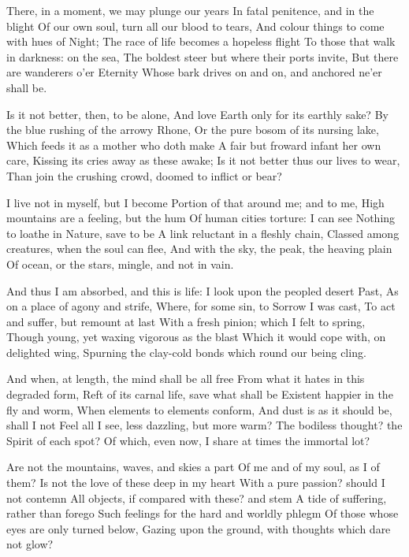 \documentclass[10pt,twocolumn]{book}
\begin{document}
   There, in a moment, we may plunge our years
   In fatal penitence, and in the blight
   Of our own soul, turn all our blood to tears,
   And colour things to come with hues of Night;
   The race of life becomes a hopeless flight
   To those that walk in darkness:  on the sea,
   The boldest steer but where their ports invite,
   But there are wanderers o'er Eternity
Whose bark drives on and on, and anchored ne'er shall be.


   Is it not better, then, to be alone,
   And love Earth only for its earthly sake?
   By the blue rushing of the arrowy Rhone,
   Or the pure bosom of its nursing lake,
   Which feeds it as a mother who doth make
   A fair but froward infant her own care,
   Kissing its cries away as these awake;\textemdash
   Is it not better thus our lives to wear,
Than join the crushing crowd, doomed to inflict or bear?


   I live not in myself, but I become
   Portion of that around me; and to me,
   High mountains are a feeling, but the hum
   Of human cities torture:  I can see
   Nothing to loathe in Nature, save to be
   A link reluctant in a fleshly chain,
   Classed among creatures, when the soul can flee,
   And with the sky, the peak, the heaving plain
Of ocean, or the stars, mingle, and not in vain.


   And thus I am absorbed, and this is life:
   I look upon the peopled desert Past,
   As on a place of agony and strife,
   Where, for some sin, to Sorrow I was cast,
   To act and suffer, but remount at last
   With a fresh pinion; which I felt to spring,
   Though young, yet waxing vigorous as the blast
   Which it would cope with, on delighted wing,
Spurning the clay-cold bonds which round our being cling.


   And when, at length, the mind shall be all free
   From what it hates in this degraded form,
   Reft of its carnal life, save what shall be
   Existent happier in the fly and worm,\textemdash
   When elements to elements conform,
   And dust is as it should be, shall I not
   Feel all I see, less dazzling, but more warm?
   The bodiless thought? the Spirit of each spot?
Of which, even now, I share at times the immortal lot?


   Are not the mountains, waves, and skies a part
   Of me and of my soul, as I of them?
   Is not the love of these deep in my heart
   With a pure passion? should I not contemn
   All objects, if compared with these? and stem
   A tide of suffering, rather than forego
   Such feelings for the hard and worldly phlegm
   Of those whose eyes are only turned below,
Gazing upon the ground, with thoughts which dare not glow?
\end{document}
